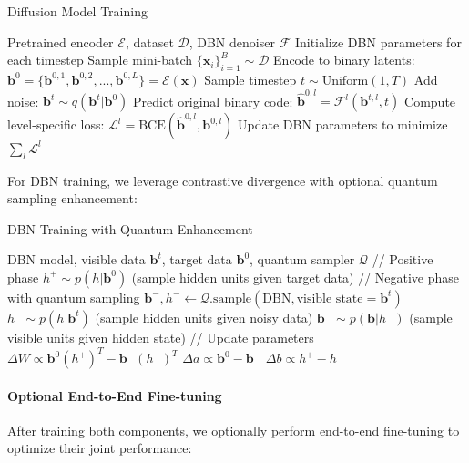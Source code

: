 \documentclass[10pt,twocolumn,letterpaper]{article}
\newcommand{\bm}[1]{\boldsymbol{#1}}
\newcommand{\binary}{\bm{b}}
\newcommand{\encoder}{\mathcal{E}}
\newcommand{\denoiser}{\mathcal{F}}
\newcommand{\img}{\bm{x}}
\newcommand{\sampling}{\mathcal{Q}}
\begin{document}
\begin{algorithm}
\caption{Diffusion Model Training}
\label{alg:diffusion_training}
\begin{algorithmic}[1]
\REQUIRE Pretrained encoder $\encoder$, dataset $\mathcal{D}$, DBN denoiser $\denoiser$
\STATE Initialize DBN parameters for each timestep
\REPEAT
    \STATE Sample mini-batch $\{\img_i\}_{i=1}^B \sim \mathcal{D}$
    \STATE Encode to binary latents: $\binary^0 = \{\binary^{0,1}, \binary^{0,2}, ..., \binary^{0,L}\} = \encoder(\img)$
    \STATE Sample timestep $t \sim \text{Uniform}(1, T)$
    \STATE Add noise: $\binary^t \sim q(\binary^t|\binary^0)$
        \STATE Predict original binary code: $\hat{\binary}^{0,l} = \denoiser^l(\binary^{t,l}, t)$
        \STATE Compute level-specific loss: $\mathcal{L}^l = \text{BCE}(\hat{\binary}^{0,l}, \binary^{0,l})$
    \ENDFOR
    \STATE Update DBN parameters to minimize $\sum_l \mathcal{L}^l$
\end{algorithmic}
\end{algorithm}

For DBN training, we leverage contrastive divergence with optional quantum sampling enhancement:

\begin{algorithm}
\caption{DBN Training with Quantum Enhancement}
\label{alg:dbn_quantum_training}
\begin{algorithmic}[1]
\REQUIRE DBN model, visible data $\binary^t$, target data $\binary^0$, quantum sampler $\sampling$
\STATE // Positive phase
\STATE $h^+ \sim p(h|\binary^0)$ (sample hidden units given target data)
\STATE // Negative phase with quantum sampling
    \STATE $\binary^-, h^- \gets \sampling.\text{sample}(\text{DBN}, \text{visible\_state}=\binary^t)$
\ELSE
    \STATE $h^- \sim p(h|\binary^t)$ (sample hidden units given noisy data)
    \STATE $\binary^- \sim p(\binary|h^-)$ (sample visible units given hidden state)
\ENDIF
\STATE // Update parameters
\STATE $\Delta W \propto \binary^0 (h^+)^T - \binary^- (h^-)^T$
\STATE $\Delta a \propto \binary^0 - \binary^-$
\STATE $\Delta b \propto h^+ - h^-$
\end{algorithmic}
\end{algorithm}

\paragraph{Optional End-to-End Fine-tuning}
After training both components, we optionally perform end-to-end fine-tuning to optimize their joint performance:
\end{document}
